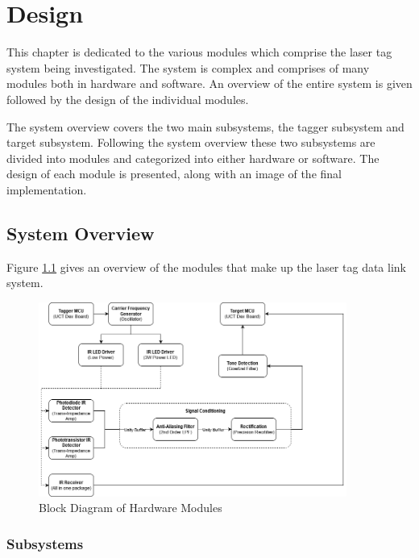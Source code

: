\chapter{Design}
\label{ch_design}

This chapter is dedicated to the various modules which comprise the laser tag system being investigated. The system is complex and comprises of many modules both in hardware and software. An overview of the entire system is given followed by the design of the individual modules.

The system overview covers the two main subsystems, the tagger subsystem and target subsystem. Following the system overview these two subsystems are divided into modules and categorized into either hardware or software. The design of each module is presented, along with an image of the final implementation.


\section{System Overview}

Figure \ref{fig:system_overview_hardware} gives an overview of the modules that make up the laser tag data link system.

\begin{figure}[H]
	\centering
	\includegraphics[width=0.9\textwidth]{figures/design/system_overview_hardware}
	\caption{Block Diagram of Hardware Modules}
	\label{fig:system_overview_hardware}
\end{figure}

\subsection{Subsystems}


